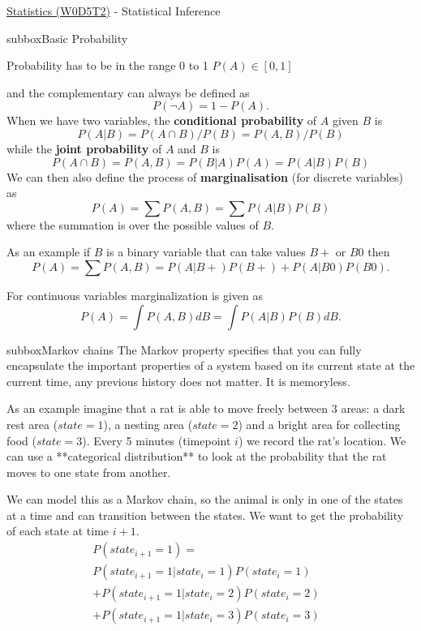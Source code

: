 \begin{textbox}{\href{https://compneuro.neuromatch.io/tutorials/W0D5_Statistics/student/W0D5_Tutorial2.html}{Statistics (W0D5T2)} - Statistical Inference}
\begin{subbox}{subbox}{Basic Probability}
\scriptsize

Probability has to be in the range 0 to 1
$P(A) \in  [0,1] $

and the complementary can always be defined as
$$P(\neg A) = 1-P(A).$$
When we have two variables, the \textbf{conditional probability} of $A$ given $B$ is 
$$P (A|B) = P (A \cap B)/P (B)=P (A, B)/P (B)$$
while the \textbf{joint probability} of $A$ and $B$ is
$$P(A \cap B)=P(A,B) = P(B|A)P(A) = P(A|B)P(B) $$
We can then also define the process of \textbf{marginalisation} (for discrete variables) as 
$$P(A)=\sum P(A,B)=\sum P(A|B)P(B)$$ 
where the summation is over the possible values of $B$.

As an example if $B$ is a binary variable that can take values $B+$ or $B0$ then 
$$P(A)=\sum P(A,B)=P(A|B+)P(B+)+ P(A|B0)P(B0). $$

For continuous variables marginalization is given as 
$$P(A)=\int P(A,B) dB=\int P(A|B)P(B) dB.$$ 
\end{subbox}
\begin{subbox}{subbox}{Markov chains}
\scriptsize
The Markov property specifies that you can fully encapsulate the important properties of a system based on its current state at the current time, any previous history does not matter. It is memoryless.

As an example imagine that a rat is able to move freely between 3 areas: a dark rest area
($state=1$), a nesting area ($state=2$) and a bright area for collecting food ($state=3$). Every 5 minutes (timepoint $i$) we record the rat's location. We can use a **categorical distribution** to look at the probability that the rat moves to one state from another.

We can model this as a Markov chain, so the animal is only in one of the states at a time and can transition between the states.
We want to get the probability of each state at time $i+1$.
\begin{align*}
P(state_{i+1} = 1)=&\\ P(state_{i+1}=1|state_i=1)P(state_i = 1)  \\ +P(state_{i+1}=1|state_i=2)P(state_i = 2)  \\ +P(state_{i+1}=1|state_i=3)P(state_i = 3)
\end{align*}

\end{subbox}
\end{textbox}
